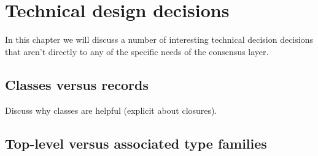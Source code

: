 \chapter{Technical design decisions}
\label{technical}

In this chapter we will discuss a number of interesting technical decision
decisions that aren't directly to any of the specific needs of the consensus
layer.

\section{Classes versus records}
\label{technical:classes-vs-records}

Discuss why classes are helpful (explicit about closures).

\section{Top-level versus associated type families}
\label{technical:toplevel-vs-associated}
